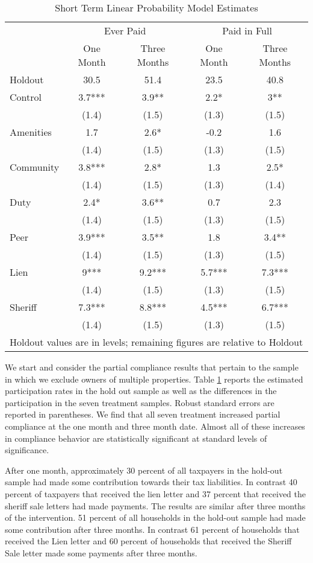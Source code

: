 \documentclass[12pt]{article}
\begin{document}
\begin{table}[ht]
\centering
\caption{Short Term Linear Probability Model Estimates} \label{pc_lin}
\begin{tabular}{l c c c c}
\hline
& \multicolumn{2}{c}{Ever Paid} & \multicolumn{2}{c}{Paid in Full} \\
& One Month & Three Months & One Month & Three Months \\
Holdout & 30.5 & 51.4 & 23.5 & 40.8 \\ 
\hline
Control & 3.7*** & 3.9** & 2.2* & 3** \\ 
   & (1.4) & (1.5) & (1.3) & (1.5) \\ 
Amenities & 1.7 & 2.6* & -0.2 & 1.6 \\ 
   & (1.4) & (1.5) & (1.3) & (1.5) \\ 
Community & 3.8*** & 2.8* & 1.3 & 2.5* \\ 
   & (1.4) & (1.5) & (1.3) & (1.4) \\ 
Duty & 2.4* & 3.6** & 0.7 & 2.3 \\ 
   & (1.4) & (1.5) & (1.3) & (1.5) \\ 
Peer & 3.9*** & 3.5** & 1.8 & 3.4** \\ 
   & (1.4) & (1.5) & (1.3) & (1.5) \\ 
Lien & 9*** & 9.2*** & 5.7*** & 7.3*** \\ 
   & (1.4) & (1.5) & (1.3) & (1.5) \\ 
Sheriff & 7.3*** & 8.8*** & 4.5*** & 6.7*** \\ 
   & (1.4) & (1.5) & (1.3) & (1.5) \\  
 \hline 
\multicolumn{5}{l}{\scriptsize{Holdout values are in levels; remaining
    figures are relative to Holdout}} \\
\end{tabular}
\end{table}

We start and consider the partial compliance results that pertain to
the sample in which we exclude owners of multiple properties.  Table
\ref{pc_lin} reports the estimated participation rates in the hold out
sample as well as the differences in the participation in the seven
treatment samples. Robust standard errors are reported in
parentheses. We find that all seven treatment increased partial
compliance at the one month and three month date. Almost all of these
increases in compliance behavior are statistically significant at
standard levels of significance.

After one month, approximately 30 percent of all taxpayers in the
hold-out sample had made some contribution towards their tax
liabilities. In contrast 40 percent of taxpayers that received the
lien letter and 37 percent that received the sheriff sale letters had
made payments. The results are similar after three months of the
intervention.  51 percent of all households in the hold-out sample had
made some contribution after three months. In contrast 61 percent of
households that received the Lien letter and 60 percent of households
that received the Sheriff Sale letter made some payments after three
months.
\end{document}
